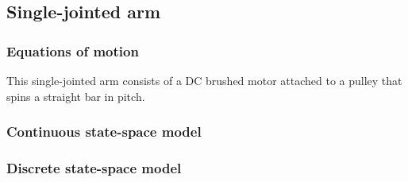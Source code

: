 \subsection{Single-jointed arm}

\subsubsection{Equations of motion}

This single-jointed arm consists of a DC brushed motor attached to a pulley that
spins a straight bar in pitch.

\subsubsection{Continuous state-space model}

\subsubsection{Discrete state-space model}
